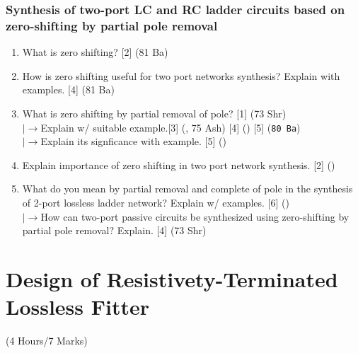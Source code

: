 \documentclass[12pt]{article}
\newcommand{\lb}{\\$\left|\rightarrow\right.$}
\begin{document}
\subsubsection{Synthesis of two-port LC and RC ladder circuits based on zero-shifting by partial pole removal}
\begin{enumerate}
	\item What is zero shifting? \hfill [2] (81 Ba)
	
	\item How is zero shifting useful for two port networks synthesis? Explain with examples. \hfill [4] (81 Ba)
	
	\item What is zero shifting by partial removal of pole? \hfill [1] (73 Shr)
	\lb Explain w/ suitable example.\hfill [3] (, 75 Ash) [4] () [5] (\texttt{80 Ba})
	\lb Explain its signficance with example. \hfill [5] ()
	
	\item Explain importance of zero shifting in two port network synthesis. \hfill [2] ()

	\item What do you mean by partial removal and complete of pole in the synthesis of 2-port lossless ladder network? Explain w/ examples. \hfill [6] ()
	\lb How can two-port passive circuits be synthesized using zero-shifting by partial pole removal? Explain. \hfill [4] (73 Shr)
\end{enumerate}

\pagebreak
\section{Design of Resistivety-Terminated Lossless Fitter}
\begin{center}(4 Hours/7 Marks)\end{center}
\end{document}
